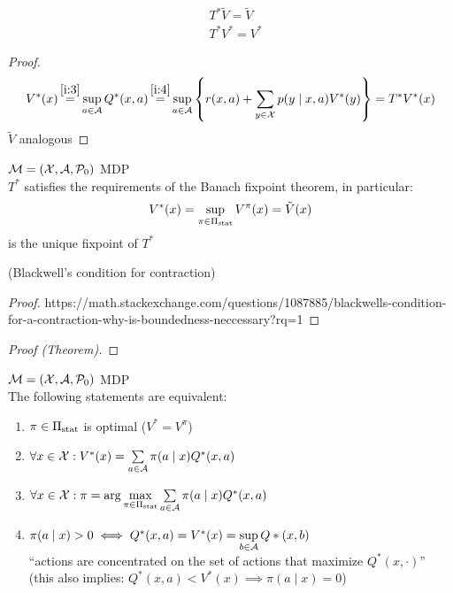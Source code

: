 \begin{corollary}
	\begin{align*}
	&T^*\tilde{V}=\tilde{V}\\
	&T^*V^*=V^*
	\end{align*}
\end{corollary}

\begin{proof}
\begin{align*}
	V^*(x)\xeq{\ref{i:3}}\sup_{a\in\cA}Q^*(x,a)\xeq{\ref{i:4}}\sup_{a\in\cA}\left\{r(x,a)+\sum_{y\in\cX}p(y\mid x,a) V^*(y)\right\} =T^*V^*(x)
\end{align*}
\(\tilde{V}\) analogous
\end{proof}


\begin{thm}\(\mathcal{M}=(\mathcal{X},\mathcal{A},\mathcal{P}_0)\) MDP\\
\(T^*\) satisfies the requirements of the Banach fixpoint theorem, in particular:
	\[V^*(x)=\sup_{\pi\in\Pi_{\textnormal{stat}}}V^\pi(x)=\tilde{V}(x) \]
is the unique fixpoint of \(T^*\)
\end{thm}

\begin{lemma}(Blackwell's condition for contraction)
\end{lemma}

\begin{proof}
https://math.stackexchange.com/questions/1087885/blackwells-condition-for-a-contraction-why-is-boundedness-neccessary?rq=1
\end{proof}

\begin{proof}[Proof (Theorem)]
\end{proof}


\begin{prop}\label{sup is attained}\(\mathcal{M}=(\mathcal{X},\mathcal{A},\mathcal{P}_0)\) MDP\\
The following statements are equivalent:
\begin{enumerate}[label={(\roman*)},font=\normalfont]
\item \(\pi \in\Pi_{\textnormal{stat}}\) is optimal (\(V^*=V^\pi\))
\item \(\forall x\in\mathcal{X}: V^*(x)=\sum\limits_{a\in\mathcal{A}}\pi(a\mid x)Q^*(x,a)\)
\item\label{ii:3} \(\forall x\in\mathcal{X}: \pi=\arg\max\limits_{\pi\in\Pi_{\textnormal{stat}}}\sum\limits_{a\in\mathcal{A}}\pi(a\mid x)Q^*(x,a) \)
\item \(\pi(a\mid x)>0 \iff Q^*(x,a)=V^*(x) =\sup\limits_{b\in\mathcal{A}}Q*(x,b)\) \\
	``actions are concentrated on the set of actions that maximize \(Q^*(x,\cdot)\)''\\
	(this also implies: \(Q^*(x,a)<V^*(x) \implies \pi(a\mid x)=0\))
\end{enumerate}
\end{prop}

